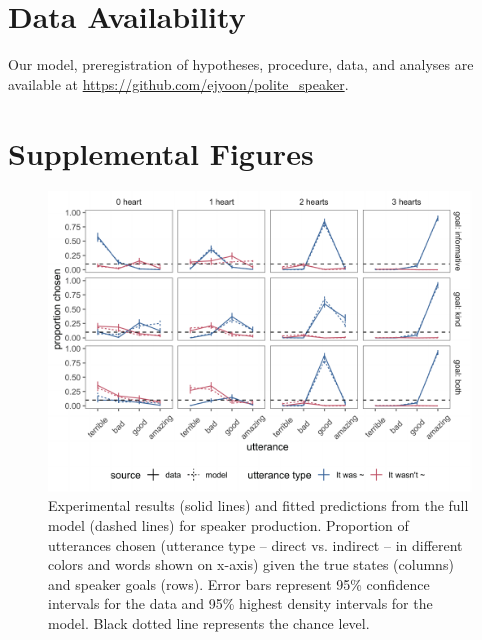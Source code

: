 \documentclass[oneside]{report}
\begin{document}
\section{Data Availability}\label{data-availability}

Our model, preregistration of hypotheses, procedure, data, and analyses
are available at \url{https://github.com/ejyoon/polite_speaker}.

\section{Supplemental Figures}\label{supplemental-figures}
\begin{figure}[!h]

{\centering \includegraphics[width=\textwidth]{erica_yoon_dissertation_files/figure-latex/utterancePlacement-1} 

}

\caption[Full comparison between experimental results and model predictions.]{Experimental results (solid lines) and fitted predictions from the full model (dashed lines) for speaker production. Proportion of utterances chosen (utterance type – direct vs. indirect – in different colors and words shown on x-axis) given the true states (columns) and speaker goals (rows). Error bars represent 95\% confidence intervals for the data and 95\% highest density intervals for the model. Black dotted line represents the chance level.}\label{fig:utterancePlacement}
\end{figure}
\end{document}
